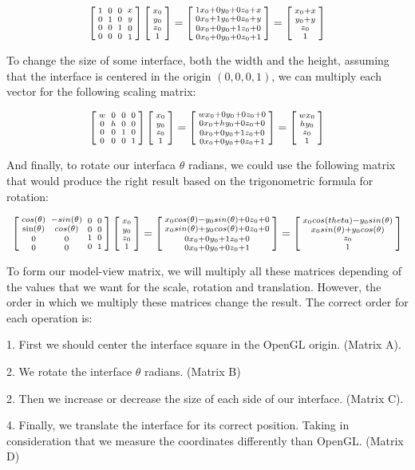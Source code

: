 $$ \left[{{1 \atop 0}\atop {0\atop 0}}{{0 \atop 1}\atop {0 \atop
      0}}{{0\atop 0}\atop{1 \atop 0}}{{x \atop y}\atop{0\atop
      1}}\right]\left[{{x_0\atop y_0}\atop {z_0\atop
      1}}\right]=\left[{{1x_0+0y_0+0z_0+x\atop 0x_0+1y_0+0z_0+y}\atop
    {0x_0+0y_0+1z_0+0\atop
      0x_0+0y_0+0z_0+1}}\right]=\left[{{x_0+x\atop y_0+y}\atop
    {z_0\atop 1}}\right]
$$


To change the size of some interface, both the width and the height,
assuming that the interface is centered in the origin $(0, 0, 0, 1)$,
we can multiply each vector for the following scaling matrix:

$$ \left[{{w \atop 0}\atop {0\atop 0}}{{0 \atop h}\atop {0 \atop
      0}}{{0\atop 0}\atop{1 \atop 0}}{{0 \atop 0}\atop{0\atop
      1}}\right]\left[{{x_0\atop y_0}\atop {z_0\atop
      1}}\right]=\left[{{wx_0+0y_0+0z_0+0\atop 0x_0+hy_0+0z_0+0}\atop
    {0x_0+0y_0+1z_0+0\atop 0x_0+0y_0+0z_0+1}}\right]=\left[{{wx_0\atop
      hy_0}\atop {z_0\atop 1}}\right]
$$

And finally, to rotate our interfaca $\theta$ radians, we could use
the following matrix that would produce the right result based on the
trigonometric formula for rotation:

$$ \left[{{cos(\theta) \atop \sin(\theta)}\atop {0\atop
      0}}{{-sin(\theta) \atop cos(\theta)}\atop {0 \atop 0}}{{0\atop
      0}\atop{1 \atop 0}}{{0 \atop 0}\atop{0\atop
      1}}\right]\left[{{x_0\atop y_0}\atop {z_0\atop
      1}}\right]=\left[{{x_0 cos(\theta)-y_0 sin(\theta)+0z_0+0\atop
      x_0 sin(\theta)+y_0 cos(\theta)+0z_0+0}\atop
    {0x_0+0y_0+1z_0+0\atop 0x_0+0y_0+0z_0+1}}\right]=\left[{{x_0
      cos(theta) - y_0 sin(\theta) \atop x_0 sin(\theta) + y_0
      cos(\theta)}\atop {z_0\atop 1}}\right]
$$

To form our model-view matrix, we will multiply all these matrices
depending of the values that we want for the scale, rotation and
translation. However, the order in which we multiply these matrices
change the result. The correct order for each operation is:

1. First we should center the interface square in the OpenGL
origin. (Matrix A).

2. We rotate the interface $\theta$ radians. (Matrix B)

2. Then we increase or decrease the size of each side of our
interface. (Matrix C).

4. Finally, we translate the interface for its correct
position. Taking in consideration that we measure the coordinates
differently than OpenGL. (Matrix D)

